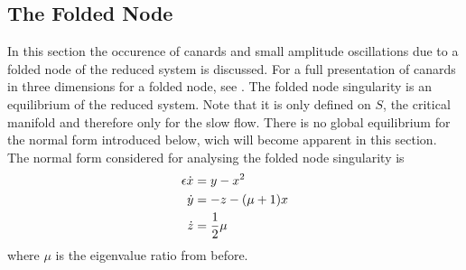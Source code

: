 \subsection{The Folded Node}
In this section the occurence of canards and small amplitude oscillations due to a folded node of the reduced system is discussed. For a full presentation of canards in three dimensions for a folded node, see \citep{wechselberger2005}.
The folded node singularity is an equilibrium of the reduced system. Note that it is only defined on $S$, the critical manifold and therefore only for the slow flow. There is no global equilibrium for the normal form introduced below, wich will become apparent in this section.
The normal form considered for analysing the folded node singularity is
\begin{align}\label{normalform2}
\epsilon \dot{x} &= y - x^2\\ \notag
\dot{y} &=- z -(\mu +1)x \\
\dot{z} &= \frac{1}{2} \mu \notag
\end{align}
where $\mu$ is the eigenvalue ratio from before.

